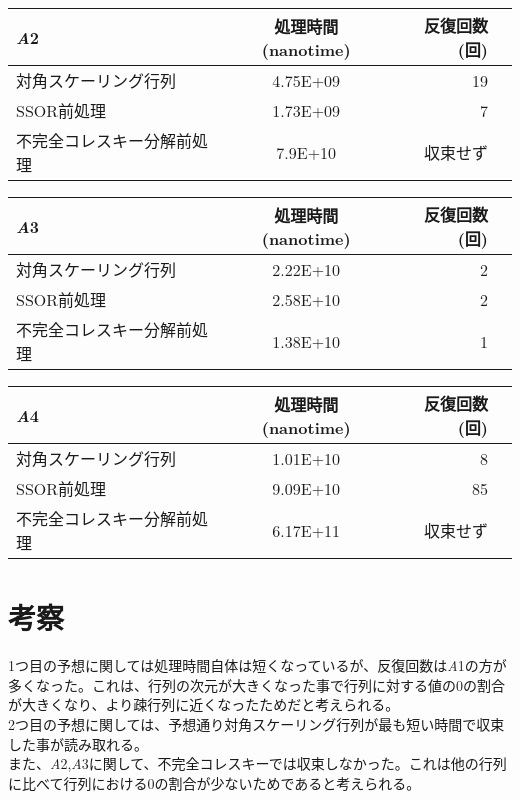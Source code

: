 ﻿\documentclass[12pt, a4paper]{jsarticle}
\begin{document}
\begin{table}[htb]
  \begin{tabular}{|l|c|r||r|} \hline
    {\it A}2 & 処理時間(nanotime) & 反復回数(回)  \\ \hline \hline
    対角スケーリング行列 & 4.75E+09
 & 19  \\
    SSOR前処理 & 1.73E+09 & 7  \\
    不完全コレスキー分解前処理 & 7.9E+10 & 収束せず  \\ \hline
  \end{tabular}
\end{table}

\begin{table}[htb]
  \begin{tabular}{|l|c|r||r|} \hline
    {\it A}3 & 処理時間(nanotime) & 反復回数(回)  \\ \hline \hline
    対角スケーリング行列 & 2.22E+10
 & 2  \\
    SSOR前処理 & 2.58E+10 & 2  \\
    不完全コレスキー分解前処理 & 1.38E+10 & 1  \\ \hline
  \end{tabular}
\end{table}

\begin{table}[htb]
  \begin{tabular}{|l|c|r||r|} \hline
    {\it A}4 & 処理時間(nanotime) & 反復回数(回)  \\ \hline \hline
    対角スケーリング行列 & 1.01E+10
 & 8  \\
    SSOR前処理 & 9.09E+10 & 85  \\
    不完全コレスキー分解前処理 & 6.17E+11 & 収束せず  \\ \hline
  \end{tabular}
\end{table}
\section{考察}
1つ目の予想に関しては処理時間自体は短くなっているが、反復回数は{\it A}1の方が多くなった。これは、行列の次元が大きくなった事で行列に対する値の0の割合が大きくなり、より疎行列に近くなったためだと考えられる。\\
2つ目の予想に関しては、予想通り対角スケーリング行列が最も短い時間で収束した事が読み取れる。\\
また、{\it A}2,{\it A}3に関して、不完全コレスキーでは収束しなかった。これは他の行列に比べて行列における0の割合が少ないためであると考えられる。
\end{document}
